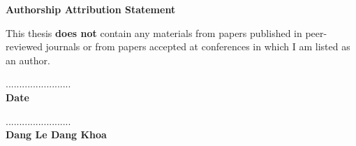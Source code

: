 \begin{center}
    \textbf{\large Authorship Attribution Statement}
\end{center}


\noindent This thesis \textbf{does not} contain any materials from papers published in peer-reviewed journals or from papers accepted at conferences in which I am listed as an author.

\vspace{2in}

\begin{multicols}{2}
    \begin{flushleft}
        ........................ \\
        \textbf{Date}
    \end{flushleft}

    \columnbreak

    \begin{flushright}
        ........................ \\
        \textbf{Dang Le Dang Khoa} \\
    \end{flushright}
\end{multicols}
